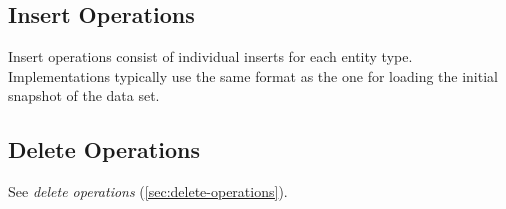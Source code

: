 \subsection{Insert Operations}
\label{sec:bi-inserts}

Insert operations consist of individual inserts for each entity type.
Implementations typically use the same format as the one for loading the initial snapshot of the data set.

\subsection{Delete Operations}
\label{sec:deletes}

See \emph{delete operations} (\autoref{sec:delete-operations}).

